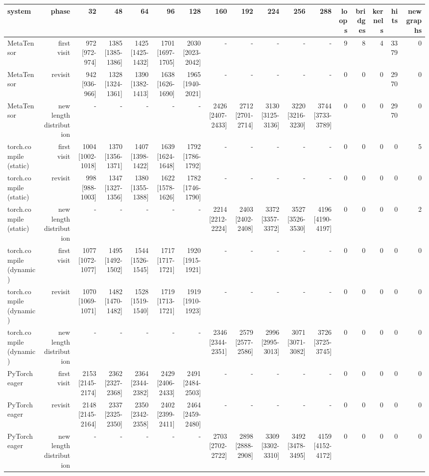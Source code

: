 \begin{tabular}{lrrrrrrrrrrrrrrrr}
\toprule
system & phase & 32 & 48 & 64 & 96 & 128 & 160 & 192 & 224 & 256 & 288 & loops & bridges & kernels & hits & new graphs \\
\midrule
MetaTensor & first visit & 972 [972-974] & 1385 [1385-1386] & 1425 [1425-1432] & 1701 [1697-1705] & 2030 [2023-2042] & - & - & - & - & - & 9 & 8 & 4 & 3379 & 0 \\
MetaTensor & revisit & 942 [936-966] & 1328 [1324-1361] & 1390 [1382-1413] & 1638 [1626-1690] & 1965 [1940-2021] & - & - & - & - & - & 0 & 0 & 0 & 2970 & 0 \\
MetaTensor & new length distribution & - & - & - & - & - & 2426 [2407-2433] & 2712 [2701-2714] & 3130 [3125-3136] & 3220 [3216-3230] & 3744 [3733-3789] & 0 & 0 & 0 & 2970 & 0 \\
torch.compile (static) & first visit & 1004 [1002-1018] & 1370 [1356-1371] & 1407 [1398-1422] & 1639 [1624-1648] & 1792 [1786-1792] & - & - & - & - & - & 0 & 0 & 0 & 0 & 5 \\
torch.compile (static) & revisit & 998 [988-1003] & 1347 [1327-1356] & 1380 [1355-1388] & 1622 [1578-1626] & 1782 [1746-1790] & - & - & - & - & - & 0 & 0 & 0 & 0 & 0 \\
torch.compile (static) & new length distribution & - & - & - & - & - & 2214 [2212-2224] & 2403 [2402-2408] & 3372 [3357-3372] & 3527 [3526-3530] & 4196 [4190-4197] & 0 & 0 & 0 & 0 & 2 \\
torch.compile (dynamic) & first visit & 1077 [1072-1077] & 1495 [1492-1502] & 1544 [1526-1545] & 1717 [1717-1721] & 1920 [1915-1921] & - & - & - & - & - & 0 & 0 & 0 & 0 & 0 \\
torch.compile (dynamic) & revisit & 1070 [1069-1071] & 1482 [1470-1482] & 1528 [1519-1540] & 1719 [1713-1721] & 1919 [1910-1923] & - & - & - & - & - & 0 & 0 & 0 & 0 & 0 \\
torch.compile (dynamic) & new length distribution & - & - & - & - & - & 2346 [2344-2351] & 2579 [2577-2586] & 2996 [2995-3013] & 3071 [3071-3082] & 3726 [3725-3745] & 0 & 0 & 0 & 0 & 0 \\
PyTorch eager & first visit & 2153 [2145-2174] & 2362 [2327-2368] & 2364 [2344-2382] & 2429 [2406-2433] & 2491 [2484-2503] & - & - & - & - & - & 0 & 0 & 0 & 0 & 0 \\
PyTorch eager & revisit & 2148 [2145-2164] & 2337 [2325-2350] & 2350 [2342-2358] & 2402 [2399-2411] & 2464 [2459-2480] & - & - & - & - & - & 0 & 0 & 0 & 0 & 0 \\
PyTorch eager & new length distribution & - & - & - & - & - & 2703 [2702-2722] & 2898 [2888-2908] & 3309 [3302-3310] & 3492 [3478-3495] & 4159 [4152-4172] & 0 & 0 & 0 & 0 & 0 \\
\bottomrule
\end{tabular}
